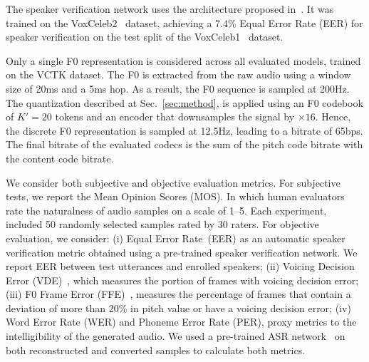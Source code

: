 The speaker verification network uses the architecture proposed in~\cite{heigold2016end}. It was trained on the VoxCeleb2~\cite{voxceleb2} dataset, achieving a 7.4\% Equal Error Rate (EER) for speaker verification on the test split of the VoxCeleb1~\cite{Nagrani17} dataset.

Only a single F0 representation is considered across all evaluated models, trained on the VCTK dataset.
The F0 is extracted from the raw audio using a window size of 20ms and a 5ms hop. 
As a result, the F0 sequence is sampled at 200Hz. 
The quantization described at Sec.~\ref{sec:method}, is applied using an F0 codebook of $K'=20$ tokens and an encoder that downsamples the signal by $\times16$. Hence, the discrete F0 representation is sampled at 12.5Hz, leading to a bitrate of 65bps. The final bitrate of the evaluated codecs is the sum of the pitch code bitrate with the content code bitrate.

{} 
We consider both subjective and objective evaluation metrics. For subjective tests, we report the Mean Opinion Scores (MOS). In which human evaluators rate the naturalness of audio samples on a scale of 1--5. Each experiment, included 50 randomly selected samples rated by 30 raters. For objective evaluation, we consider: (i) Equal Error Rate~(EER) as an automatic speaker verification metric obtained using a pre-trained speaker verification network. We report EER between test utterances and enrolled speakers; (ii) Voicing Decision Error (VDE)~\cite{nakatani2008method}, which measures the portion of frames with voicing decision error; (iii) F0 Frame Error (FFE)~\cite{chu2009reducing}, measures the percentage of frames that contain a deviation of more than 20\% in pitch value or have a voicing decision error; (iv) Word Error Rate (WER) and Phoneme Error Rate (PER), proxy metrics to the intelligibility of the generated audio. We used a pre-trained ASR network~\cite{baevski2020wav2vec} on both reconstructed and converted samples to calculate both metrics. %


